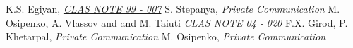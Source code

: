 \begin{thebibliography}{mybib}
     {K.S. Egiyan}, \href{http://www.jlab.org/Hall-B/notes/clas_notes99/ec_thresh.ps}{\it CLAS NOTE 99 - 007}
  {S. Stepanya}, {\it Private Communication}
   {M. Osipenko, A. Vlassov and and M. Taiuti } \href{http://www1.jlab.org/ul/Physics/Hall-B/clas/public/2004-020.pdf}{\it CLAS NOTE 04 - 020}
  {F.X. Girod, P. Khetarpal}, {\it Private Communication}
    {M. Osipenko}, {\it Private Communication}

\end{thebibliography}
